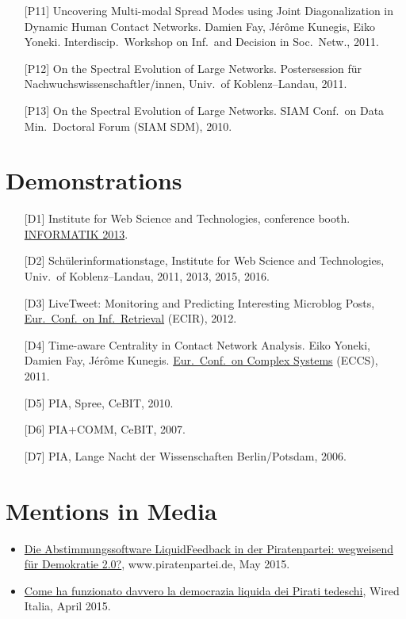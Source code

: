 \documentclass[line,mm]{res}
\newcounter{x}
\begin{document}
\begin{resume}
\begin{itemize}
  \item[{[P11]}]
    Uncovering Multi-modal Spread Modes using Joint 
    Diagonalization in Dynamic Human Contact Networks. 
    Damien Fay, Jérôme Kunegis, Eiko Yoneki.  Interdiscip.\ Workshop on Inf.\ and Decision in Soc.\ Netw., 2011. 
  \item[{[P12]}]
    On the Spectral Evolution of Large Networks. Postersession 
    für Nachwuchswissenschaftler/innen, Univ.\ of Koblenz--Landau,
    2011. 
  \item[{[P13]}]
    On the Spectral Evolution of Large Networks. SIAM 
    Conf.\ on Data Min.\ Doctoral Forum (SIAM SDM), 2010. 
\end{itemize}

\section{Demonstrations}
\begin{itemize}
 \item[{[D1]}] Institute for Web Science and Technologies, conference booth.
       \href{http://informatik2013.de}{INFORMATIK 2013}.  
 \item[{[D2]}] Schülerinformationstage, Institute for Web Science and
       Technologies, Univ.\ of Koblenz--Landau, 2011, 2013, 2015, 2016.  
 \item[{[D3]}] LiveTweet: Monitoring and Predicting Interesting Microblog
       Posts, \href{http://ecir2012.upf.edu/}{Eur.\ Conf.\ on Inf.\ Retrieval} (ECIR),
       2012. 
 \item[{[D4]}] Time-aware Centrality in Contact Network Analysis.
       Eiko Yoneki, Damien Fay, Jérôme Kunegis.
       \href{http://www.eccs2011.eu/}{Eur.\ Conf.\ on Complex Systems} (ECCS), 2011. 
 \item[{[D5]}] PIA, Spree, CeBIT, 2010.
 \item[{[D6]}] PIA+COMM, CeBIT, 2007.
 \item[{[D7]}] PIA, Lange Nacht der Wissenschaften Berlin/Potsdam, 2006. 
\end{itemize}

\section{Mentions in Media}
\begin{itemize}
  \item
    \href{https://www.piratenpartei.de/2015/05/31/die-abstimmungssoftware-liquidfeedback-der-piratenpartei-wegweisend-fuer-demokratie-2-0/}{Die
      Abstimmungssoftware LiquidFeedback in der Piratenpartei:
      wegweisend für Demokratie 2.0?}, www.piratenpartei.de, May 2015. 
\item
  \href{http://www.wired.it/attualita/2015/04/01/come-funzionato-davvero-democrazia-liquida-dei-pirati-tedeschi/}{Come
    ha funzionato davvero la democrazia liquida dei Pirati tedeschi},
  Wired Italia, April 2015. 
\end{itemize}


\end{resume}
\end{document}
